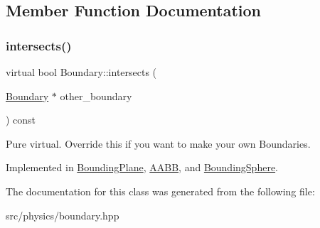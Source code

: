 \subsection{Member Function Documentation}
\mbox{\label{class_boundary_a364909bdfa4a4945f974c34a39e198cc}} 
\subsubsection{\texorpdfstring{intersects()}{intersects()}}
{\footnotesize\ttfamily virtual bool Boundary\+::intersects (\begin{DoxyParamCaption}\item[{\mbox{\hyperlink{class_boundary}{Boundary}} $\ast$}]{other\+\_\+boundary }\end{DoxyParamCaption}) const\hspace{0.3cm}{\ttfamily [pure virtual]}}

Pure virtual. Override this if you want to make your own Boundaries. 

Implemented in \mbox{\hyperlink{class_bounding_plane_a3d956121121f32384cab3cab34544d6e}{Bounding\+Plane}}, \mbox{\hyperlink{class_a_a_b_b_ab427a4455732a16802103e06ed4af02a}{A\+A\+BB}}, and \mbox{\hyperlink{class_bounding_sphere_aab64d759fac6a9835ac24d6fca8530d6}{Bounding\+Sphere}}.



The documentation for this class was generated from the following file\+:\begin{DoxyCompactItemize}
\item 
src/physics/boundary.\+hpp\end{DoxyCompactItemize}
